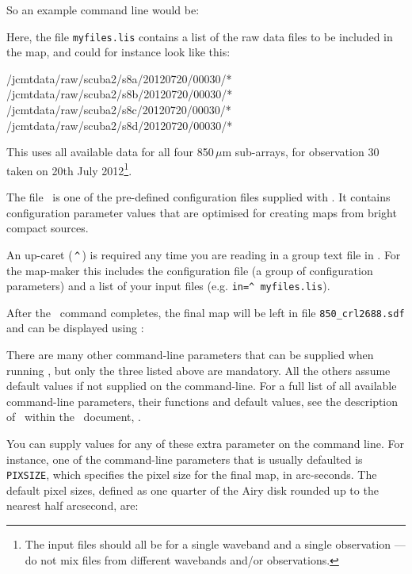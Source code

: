 So an example command line would be:

Here, the file \texttt{myfiles.lis} contains a list of the raw data
files to be included in the map, and could for instance look like this:

\begin{terminalv}
/jcmtdata/raw/scuba2/s8a/20120720/00030/*
/jcmtdata/raw/scuba2/s8b/20120720/00030/*
/jcmtdata/raw/scuba2/s8c/20120720/00030/*
/jcmtdata/raw/scuba2/s8d/20120720/00030/*
\end{terminalv}

This uses all available data for all four 850\,$\mu$m sub-arrays, for
observation 30 taken on 20th July 2012\footnote{The input files should all be
for a single waveband and a single observation --- do not mix files from
different wavebands and/or observations.}.

The file \brightcompact\ is one of the pre-defined configuration files
supplied with \smurf. It contains configuration parameter values that are
optimised for creating maps from bright compact sources.

\begin{tip}
  An up-caret (\,\texttt{\^{}}\,) is required any time you are reading
  in a group text file in \starlink. For the map-maker this includes
  the configuration file (a group of configuration parameters) and a list
  of your input files (e.g. \texttt{in=\^{}\,myfiles.lis}).
\end{tip}

After the \makemap\ command completes, the final map will be left in file
\texttt{850\_crl2688.sdf} and can be displayed using \gaia:

\begin{terminalv}
\end{terminalv}

There are many other command-line parameters that can be supplied when
running \makemap, but only the three listed above are mandatory. All the
others assume default values if not supplied on the command-line. For a
full list of all available command-line parameters, their functions and
default values, see the description of \makemap\ within the \smurf\
document, .

You can supply values for any of these extra parameter on the command
line. For instance, one of the command-line parameters that is usually
defaulted is \texttt{PIXSIZE}, which specifies the pixel size for the final
map, in arc-seconds. The default pixel sizes, defined as one quarter of the
Airy disk rounded up to the nearest half arcsecond, are:

